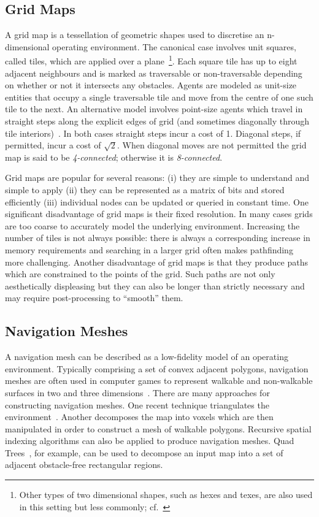 \subsection{Grid Maps}
\label{cha::lit::graphs::grid}
A grid map is a tessellation of geometric shapes used to discretise an n-dimensional
operating environment. The canonical case involves unit squares, called tiles, 
which are applied over a plane~\footnote{Other types of two dimensional shapes,
such as hexes and texes, are also used in this setting but less commonly; cf.~\citep{yap02}}.
Each square tile has up to eight adjacent neighbours and is marked 
as traversable or non-traversable depending on whether or not it
intersects any obstacles.  Agents are modeled as unit-size entities that
occupy a single traversable tile and move from the centre of one such tile 
to the next.  
An alternative model involves point-size agents which travel in straight 
steps along the explicit edges of grid (and sometimes diagonally through 
tile interiors)~\cite{nash07}.
In both cases straight steps incur a cost of 1. Diagonal steps, if permitted, 
incur a cost of $\sqrt{2}$.  When diagonal moves are not permitted the grid map 
is said to be \emph{4-connected}; otherwise it is \emph{8-connected}.  

Grid maps are popular for several reasons: (i) they are simple to understand 
and simple to apply (ii) they can be represented as a matrix of bits and stored
efficiently (iii) individual nodes can be updated or queried in constant time.
One significant disadvantage of grid maps is their fixed resolution. In many cases 
grids are too coarse to accurately model the underlying environment. Increasing the
number of tiles is not always possible: there is always a corresponding increase in
memory requirements and searching in a larger grid often makes pathfinding more 
challenging.
Another disadvantage of grid maps is that they produce paths which are
constrained to the points of the grid. Such paths are not only aesthetically
displeasing but they can also be longer than strictly necessary and may
require post-processing to ``smooth'' them.

\subsection{Navigation Meshes}
\label{cha::lit::graphs::nav}
A navigation mesh can be described as a low-fidelity model of an operating environment.
Typically comprising a set of convex adjacent polygons, navigation meshes are
often used in computer games to represent walkable and non-walkable surfaces in
two and three dimensions~\citep{snook00,tozour02}.
There are many approaches for constructing navigation meshes.
One recent technique triangulates the environment~\citep{demyen07,kallmann10}.  
Another decomposes the map into voxels which are then manipulated in order to construct a 
mesh of walkable polygons. 
Recursive spatial indexing algorithms can also be applied to produce navigation meshes. 
Quad Trees~\citep{finkel74,samet85}, for example, can be used to decompose an input
map into a set of adjacent obstacle-free rectangular regions. 

